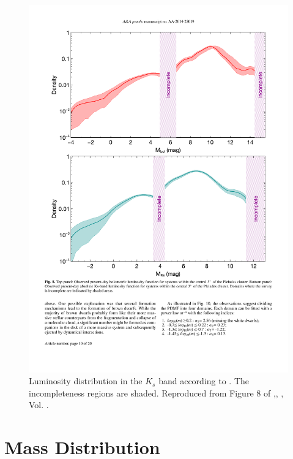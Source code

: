 \begin{figure}[ht!]
\begin{center}
\includegraphics[width=\textwidth]{background/Figures/F8_Bouy2015.pdf}
\caption{Luminosity distribution in the $K_s$ band according to \citet{Bouy2015}. The incompleteness regions are shaded. Reproduced from Figure 8 of \citet{Bouy2015},\textit{}, , Vol. .}
\label{fig:luminosityBouy}
\end{center}
\end{figure}

\section{Mass Distribution}
\label{sect:mass}

